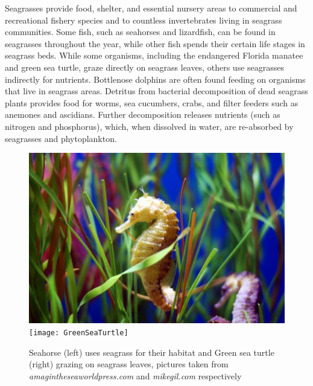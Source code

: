 \documentclass[12pt]{report}   %
\begin{document}
Seagrasses provide food, shelter, and essential nursery areas to commercial and recreational fishery species and to countless invertebrates living in seagrass communities.
Some fish, such as seahorses and lizardfish, can be found in seagrasses throughout the year, while other fish spends their certain life stages in seagrass beds. While some organisms, including the endangered Florida manatee and green sea turtle, graze directly on seagrass leaves, others use seagrasses indirectly for nutrients. Bottlenose dolphins are often found feeding on organisms that live in seagrass areas. Detritus from bacterial decomposition of dead seagrass plants provides food for worms, sea cucumbers, crabs, and filter feeders such as anemones and ascidians. Further decomposition releases nutrients (such as nitrogen and phosphorus), which, when dissolved in water, are re-absorbed by seagrasses and phytoplankton.
\begin{figure}
\centerline{ \includegraphics[scale=1.45]{SeaHorse} \texttt{[image: GreenSeaTurtle]} }
\caption{Seahorse (left) uses seagrass for their habitat and Green sea turtle (right) grazing on seagrass leaves, pictures taken from \textit{amagintheseaworldpress.com} and  \textit{mikegil.com} respectively  }
\end{figure}
\end{document}
